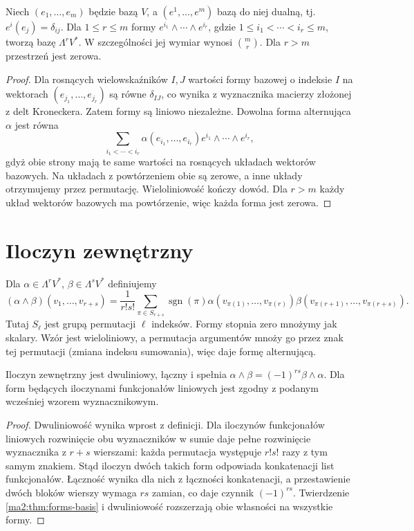 \begin{twierdzenie}
\label{ma2:thm:forms-basis}
Niech $(e_1,\ldots,e_m)$ będzie bazą $V$,
a $(e^1,\ldots,e^m)$ bazą do niej dualną, tj.
$e^i(e_j)=\delta_{ij}$.
Dla $1\le r\le m$ formy
$e^{i_1}\wedge\cdots\wedge e^{i_r}$,
gdzie $1\le i_1<\cdots<i_r\le m$, tworzą bazę
$\Lambda^r V^*$. W szczególności jej wymiar wynosi
$\binom mr$. Dla $r>m$ przestrzeń jest zerowa.
\end{twierdzenie}
\begin{proof}
Dla rosnących wielowskaźników $I,J$ wartości
formy bazowej o indeksie $I$ na wektorach
$(e_{j_1},\ldots,e_{j_r})$ są równe $\delta_{IJ}$,
co wynika z wyznacznika macierzy złożonej
z delt Kroneckera. Zatem formy są liniowo niezależne.
Dowolna forma alternująca $\alpha$ jest równa
\[
 \sum_{i_1<\cdots<i_r}\alpha(e_{i_1},\ldots,e_{i_r})
 e^{i_1}\wedge\cdots\wedge e^{i_r},
\]
gdyż obie strony mają te same wartości na
rosnących układach wektorów bazowych.
Na układach z powtórzeniem obie są zerowe,
a inne układy otrzymujemy przez permutację.
Wieloliniowość kończy dowód.
Dla $r>m$ każdy układ wektorów bazowych
ma powtórzenie, więc każda forma jest zerowa.
\end{proof}

\section{Iloczyn zewnętrzny}

Dla $\alpha\in\Lambda^r V^*$, $\beta\in\Lambda^s V^*$
definiujemy
\[
 (\alpha\wedge\beta)(v_1,\ldots,v_{r+s})
 =\frac{1}{r!s!}\sum_{\pi\in S_{r+s}}
 \operatorname{sgn}(\pi)
 \alpha(v_{\pi(1)},\ldots,v_{\pi(r)})
 \beta(v_{\pi(r+1)},\ldots,v_{\pi(r+s)}).
\]
Tutaj $S_\ell$ jest grupą permutacji $\ell$ indeksów.
Formy stopnia zero mnożymy jak skalary.
Wzór jest wieloliniowy, a permutacja argumentów
mnoży go przez znak tej permutacji (zmiana indeksu
sumowania), więc daje formę alternującą.

\begin{stwierdzenie}
\label{ma2:prop:wedge-algebra}
Iloczyn zewnętrzny jest dwuliniowy, łączny
i spełnia $\alpha\wedge\beta=(-1)^{rs}\beta\wedge\alpha$.
Dla form będących iloczynami funkcjonałów liniowych
jest zgodny z podanym wcześniej wzorem wyznacznikowym.
\end{stwierdzenie}
\begin{proof}
Dwuliniowość wynika wprost z definicji.
Dla iloczynów funkcjonałów liniowych rozwinięcie
obu wyznaczników w sumie daje pełne rozwinięcie
wyznacznika z $r+s$ wierszami: każda permutacja
występuje $r!s!$ razy z tym samym znakiem.
Stąd iloczyn dwóch takich form odpowiada
konkatenacji list funkcjonałów.
Łączność wynika dla nich z łączności konkatenacji,
a przestawienie dwóch bloków wierszy wymaga
$rs$ zamian, co daje czynnik $(-1)^{rs}$.
Twierdzenie \ref{ma2:thm:forms-basis} i dwuliniowość
rozszerzają obie własności na wszystkie formy.
\end{proof}

